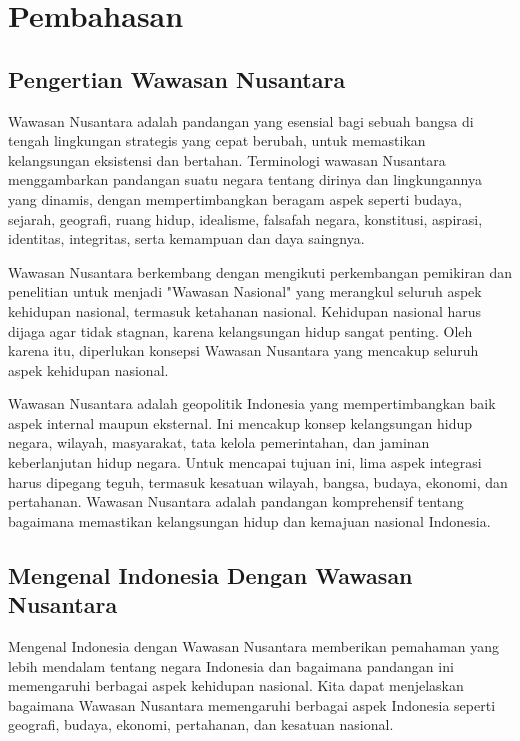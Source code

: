 \chapter{Pembahasan}
\section{Pengertian Wawasan Nusantara}
Wawasan Nusantara adalah pandangan yang esensial bagi sebuah bangsa di tengah lingkungan strategis yang cepat berubah, untuk memastikan kelangsungan eksistensi dan bertahan. Terminologi wawasan Nusantara menggambarkan pandangan suatu negara tentang dirinya dan lingkungannya yang dinamis, dengan mempertimbangkan beragam aspek seperti budaya, sejarah, geografi, ruang hidup, idealisme, falsafah negara, konstitusi, aspirasi, identitas, integritas, serta kemampuan dan daya saingnya.

Wawasan Nusantara berkembang dengan mengikuti perkembangan pemikiran dan penelitian untuk menjadi "Wawasan Nasional" yang merangkul seluruh aspek kehidupan nasional, termasuk ketahanan nasional. Kehidupan nasional harus dijaga agar tidak stagnan, karena kelangsungan hidup sangat penting. Oleh karena itu, diperlukan konsepsi Wawasan Nusantara yang mencakup seluruh aspek kehidupan nasional.

Wawasan Nusantara adalah geopolitik Indonesia yang mempertimbangkan baik aspek internal maupun eksternal. Ini mencakup konsep kelangsungan hidup negara, wilayah, masyarakat, tata kelola pemerintahan, dan jaminan keberlanjutan hidup negara. Untuk mencapai tujuan ini, lima aspek integrasi harus dipegang teguh, termasuk kesatuan wilayah, bangsa, budaya, ekonomi, dan pertahanan. Wawasan Nusantara adalah pandangan komprehensif tentang bagaimana memastikan kelangsungan hidup dan kemajuan nasional Indonesia.

\section{Mengenal Indonesia Dengan Wawasan Nusantara}

Mengenal Indonesia dengan Wawasan Nusantara memberikan pemahaman yang lebih mendalam tentang negara Indonesia dan bagaimana pandangan ini memengaruhi berbagai aspek kehidupan nasional. Kita dapat menjelaskan bagaimana Wawasan Nusantara memengaruhi berbagai aspek Indonesia seperti geografi, budaya, ekonomi, pertahanan, dan kesatuan nasional. 

